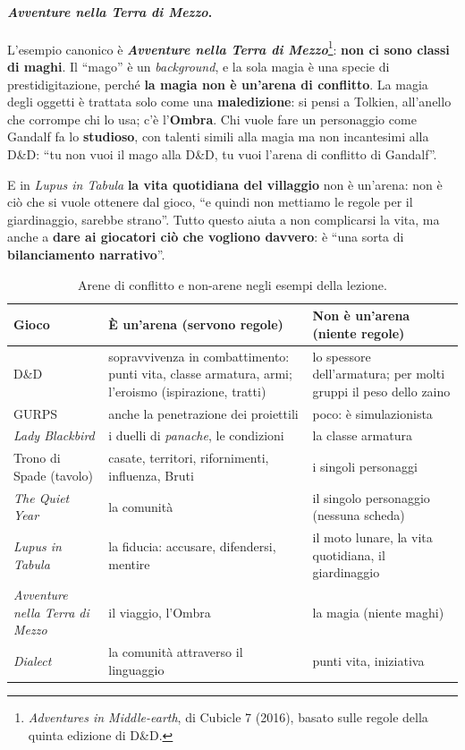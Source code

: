 \paragraph{\emph{Avventure nella Terra di Mezzo}.} L'esempio canonico è \textbf{\emph{Avventure
nella Terra di Mezzo}}\footnote{\emph{Adventures in Middle-earth}, di Cubicle 7 (2016), basato
sulle regole della quinta edizione di D\&D.}: \textbf{non ci sono classi di maghi}. Il ``mago'' è
un \emph{background}, e la sola magia è una specie di prestidigitazione, perché \textbf{la magia non
è un'arena di conflitto}. La magia degli oggetti è trattata solo come una \textbf{maledizione}: si
pensi a Tolkien, all'anello che corrompe chi lo usa; c'è l'\textbf{Ombra}. Chi vuole fare un
personaggio come Gandalf fa lo \textbf{studioso}, con talenti simili alla magia ma non incantesimi
alla D\&D: ``tu non vuoi il mago alla D\&D, tu vuoi l'arena di conflitto di Gandalf''.

E in \emph{Lupus in Tabula} \textbf{la vita quotidiana del villaggio} non è un'arena: non è ciò che
si vuole ottenere dal gioco, ``e quindi non mettiamo le regole per il giardinaggio, sarebbe
strano''. Tutto questo aiuta a non complicarsi la vita, ma anche a \textbf{dare ai giocatori ciò che
vogliono davvero}: è ``una sorta di \textbf{bilanciamento narrativo}''.

\begin{table}[htbp]
\centering
\small
\caption{Arene di conflitto e non-arene negli esempi della lezione.}
\label{a16:tab:arene}
\begin{tabular}{@{}>{\raggedright\arraybackslash}p{3.3cm}>{\raggedright\arraybackslash}p{5.0cm}>{\raggedright\arraybackslash}p{5.1cm}@{}}
\toprule
\textbf{Gioco} & \textbf{È un'arena (servono regole)} & \textbf{Non è un'arena (niente regole)} \\
\midrule
D\&D & sopravvivenza in combattimento: punti vita, classe armatura, armi; l'eroismo (ispirazione,
  tratti) & lo spessore dell'armatura; per molti gruppi il peso dello zaino \\
GURPS & anche la penetrazione dei proiettili & poco: è simulazionista \\
\emph{Lady Blackbird} & i duelli di \emph{panache}, le condizioni & la classe armatura \\
Trono di Spade (tavolo) & casate, territori, rifornimenti, influenza, Bruti & i singoli
  personaggi \\
\emph{The Quiet Year} & la comunità & il singolo personaggio (nessuna scheda) \\
\emph{Lupus in Tabula} & la fiducia: accusare, difendersi, mentire & il moto lunare, la vita
  quotidiana, il giardinaggio \\
\emph{Avventure nella Terra di Mezzo} & il viaggio, l'Ombra & la magia (niente maghi) \\
\emph{Dialect} & la comunità attraverso il linguaggio & punti vita, iniziativa \\
\bottomrule
\end{tabular}
\end{table}

